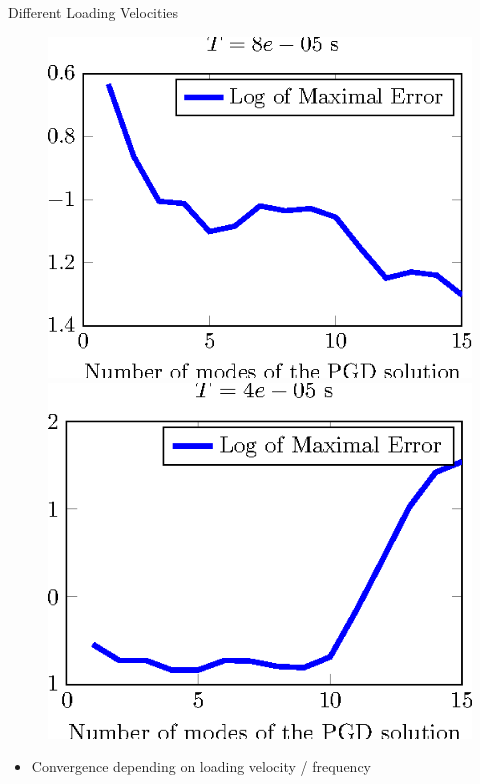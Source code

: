 \documentclass[12pt]{beamer}
\begin{document}
\begin{frame}{Different Loading Velocities}
\begin{figure}
\begin{minipage}{0.24\linewidth}
			\includegraphics[width=1\linewidth]{Error-CalculSchem3-T2-tikz.eps}
		\end{minipage}
		\begin{minipage}{0.24\linewidth}
			\includegraphics[width=1\linewidth]{Error-CalculSchem3-T1-tikz.eps}
		\end{minipage}
	\end{figure}
	\vspace{-0.5cm}
	\begin{itemize}
		\item Convergence depending on loading velocity / frequency
	\end{itemize}
\end{frame}
\end{document}
